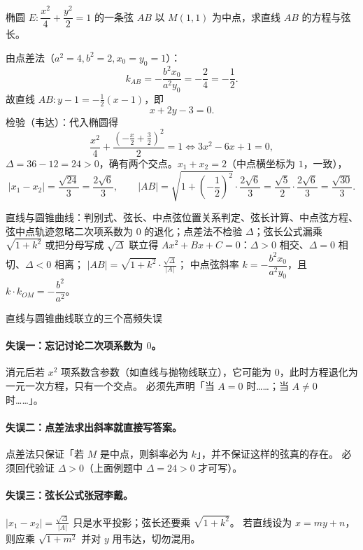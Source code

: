 \begin{explore}
\begin{example}
椭圆 $E:\dfrac{x^2}{4}+\dfrac{y^2}{2}=1$ 的一条弦 $AB$ 以 $M(1,1)$ 为中点，求直线 $AB$ 的方程与弦长。
\end{example}
\begin{solution}
由点差法（$a^2=4,b^2=2,x_0=y_0=1$）：
\[
  k_{AB}=-\frac{b^2x_0}{a^2y_0}=-\frac{2}{4}=-\frac12.
\]
故直线 $AB:y-1=-\frac12(x-1)$，即
\[
  x+2y-3=0.
\]
检验（韦达）：代入椭圆得
\[
  \frac{x^2}{4}+\frac{\left(-\frac x2+\frac32\right)^2}{2}=1
  \iff 3x^2-6x+1=0,
\]
$\Delta=36-12=24>0$，确有两个交点。$x_1+x_2=2$（中点横坐标为 $1$，一致），
\[
  |x_1-x_2|=\frac{\sqrt{24}}{3}=\frac{2\sqrt6}{3},
  \qquad
  |AB|=\sqrt{1+\left(-\frac12\right)^2}\cdot\frac{2\sqrt6}{3}
  =\frac{\sqrt5}{2}\cdot\frac{2\sqrt6}{3}=\frac{\sqrt{30}}{3}.
\]
\end{solution}

\begin{conccard}[二级]{直线与圆锥曲线：判别式、弦长、中点弦}{位置关系判定、弦长计算、中点弦方程、弦中点轨迹}{忽略二次项系数为 $0$ 的退化；点差法不检验 $\Delta$；弦长公式漏乘 $\sqrt{1+k^2}$ 或把分母写成 $\sqrt\Delta$}
联立得 $Ax^2+Bx+C=0$：$\Delta>0$ 相交、$\Delta=0$ 相切、$\Delta<0$ 相离；
$|AB|=\sqrt{1+k^2}\cdot\frac{\sqrt\Delta}{|A|}$；
中点弦斜率 $k=-\dfrac{b^2x_0}{a^2y_0}$，且 $k\cdot k_{OM}=-\dfrac{b^2}{a^2}$。
\end{conccard}

\begin{commonerror}{直线与圆锥曲线联立的三个高频失误}
\paragraph{失误一：忘记讨论二次项系数为 $0$。}
消元后若 $x^2$ 项系数含参数（如直线与抛物线联立），它可能为 $0$，此时方程退化为一元一次方程，只有一个交点。
必须先声明「当 $A=0$ 时……；当 $A\ne0$ 时……」。
\paragraph{失误二：点差法求出斜率就直接写答案。}
点差法只保证「若 $M$ 是中点，则斜率必为 $k$」，并不保证这样的弦真的存在。
必须回代验证 $\Delta>0$（上面例题中 $\Delta=24>0$ 才可写）。
\paragraph{失误三：弦长公式张冠李戴。}
$|x_1-x_2|=\frac{\sqrt\Delta}{|A|}$ 只是水平投影；弦长还要乘 $\sqrt{1+k^2}$。
若直线设为 $x=my+n$，则应乘 $\sqrt{1+m^2}$ 并对 $y$ 用韦达，切勿混用。
\end{commonerror}


\end{explore}
